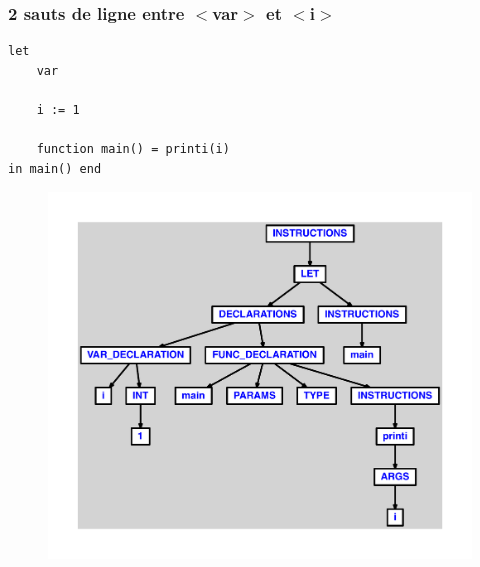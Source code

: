 \documentclass{article}
\begin{document}
\subsubsection{2 sauts de ligne entre $ < $var$ > $ et $ < $i$ > $}
\begin{lstlisting}
let
	var

	i := 1

	function main() = printi(i)
in main() end
\end{lstlisting}
\newpage
\begin{figure}[H]
\centering
\includegraphics[max width=\textwidth]{ast/ast_188.pdf}
\end{figure}
\newpage
\end{document}
